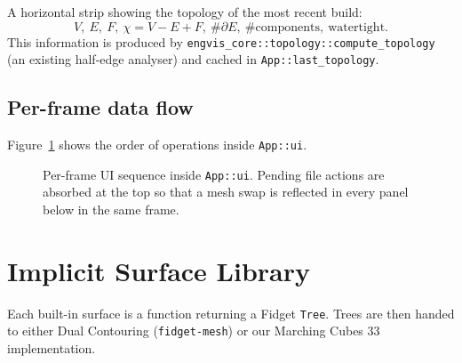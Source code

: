\documentclass[11pt]{article}
\begin{document}
A horizontal strip showing the topology of the most recent build:
\[
  V,\ E,\ F,\ \chi = V-E+F,\ \#\partial E,\
  \text{\#components},\ \text{watertight}.
\]
This information is produced by
\lstinline|engvis_core::topology::compute_topology| (an existing
half-edge analyser) and cached in
\lstinline|App::last_topology|.

\subsection{Per-frame data flow}

Figure~\ref{fig:frame} shows the order of operations inside
\lstinline|App::ui|.

\begin{figure}[h]
\centering
{}
\caption{Per-frame UI sequence inside \lstinline|App::ui|.  Pending
file actions are absorbed at the top so that a mesh swap is reflected
in every panel below in the same frame.}
\label{fig:frame}
\end{figure}

\section{Implicit Surface Library}

Each built-in surface is a function returning a Fidget
\lstinline|Tree|.  Trees are then handed to either Dual Contouring
(\texttt{fidget-mesh}) or our Marching Cubes 33 implementation.
\end{document}
